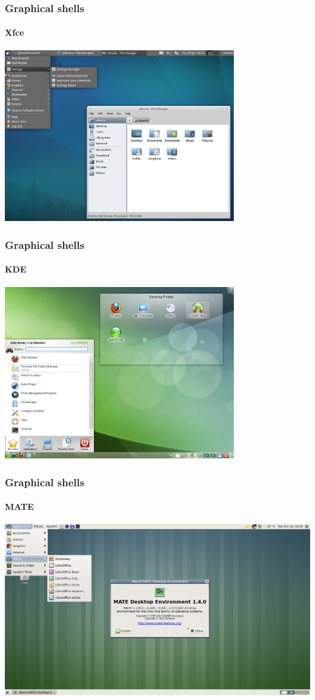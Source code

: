 \documentclass[t,table,usenames,dvipsnames]{beamer}
\begin{document}
\begin{frame}
	\frametitle{Graphical shells}
	\framesubtitle{Xfce}
	\centering
	\includegraphics[width=0.75\textwidth]{xfce.png}
\end{frame}


\begin{frame}
	\frametitle{Graphical shells}
	\framesubtitle{KDE}
	\centering
	\includegraphics[width=0.75\textwidth]{kde.png}
\end{frame}


\begin{frame}
	\frametitle{Graphical shells}
	\framesubtitle{MATE}
	\includegraphics[width=\textwidth]{mate.png}
\end{frame}
\end{document}
